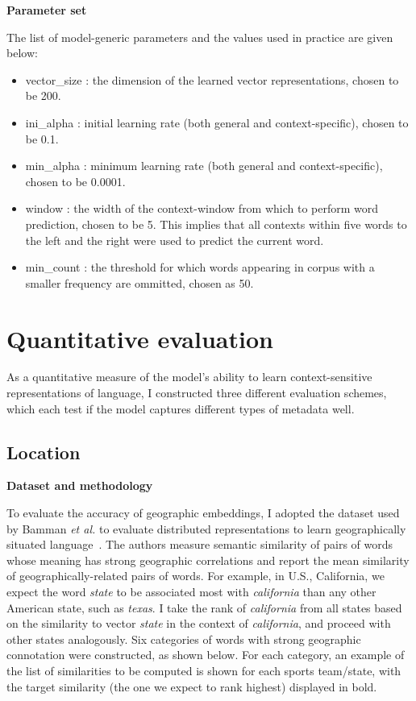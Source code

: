 \documentclass[a4paper,12pt,twoside,openright]{report}
\newcommand{\tb}{\vspace{10pt} \textbf}
\newcommand{\ti}{\textit}
\begin{document}
\tb{Parameter set}

The list of model-generic parameters and the values used in practice are given below:

\begin{itemize}[itemsep=-5pt]
	\item vector\_size : the dimension of the learned vector representations, chosen to be 200.
	\item ini\_alpha : initial learning rate (both general and context-specific), chosen to be 0.1. 
	\item min\_alpha : minimum learning rate (both general and context-specific), chosen to be 0.0001.
	\item window : the width of the context-window from which to perform word prediction, chosen to be 5. This implies that all contexts within five words to the left and the right were used to predict the current word.
	\item min\_count : the threshold for which words appearing in corpus with a smaller frequency are ommitted, chosen as 50.
\end{itemize}

\section{Quantitative evaluation}
\label{ch5:2}

As a quantitative measure of the model's ability to learn context-sensitive representations of language, I constructed three different evaluation schemes, which each test if the model captures different types of metadata well.

\subsection{Location}

\tb{Dataset and methodology}

To evaluate the accuracy of geographic embeddings, I adopted the dataset used by Bamman \ti{et al.} to evaluate distributed representations to learn geographically situated language~\cite{bamman14}. The authors measure semantic similarity of pairs of words whose meaning has strong geographic correlations and report the mean similarity of geographically-related pairs of words. For example, in U.S., California, we expect the word \ti{state} to be associated most with \ti{california} than any other American state, such as \ti{texas}. I take the rank of \ti{california} from all states based on the similarity to vector \ti{state} in the context of \ti{california}, and proceed with other states analogously. Six categories of words with strong geographic connotation were constructed, as shown below. For each category, an example of the list of similarities to be computed is shown for each sports team/state, with the target similarity (the one we expect to rank highest) displayed in bold.
\end{document}

